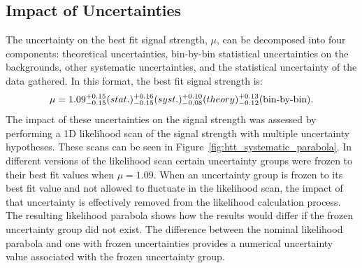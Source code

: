 %
%


\subsection{Impact of Uncertainties}
The uncertainty on the best fit signal strength, $\mu$, can be decomposed into four components: theoretical uncertainties, 
bin-by-bin statistical uncertainties on the backgrounds, other systematic uncertainties, and the statistical 
uncertainty of the data gathered. In this format, the best fit signal strength is:
\[ \mu = 1.09^{+0.15}_{-0.15}(stat.){}^{+0.16}_{-0.15}(syst.){}^{+0.10}_{-0.08}(theory){}^{+0.13}_{-0.12} \text{(bin-by-bin).}\]
The impact of these uncertainties on the signal strength was assessed by performing a 1D likelihood scan of 
the signal strength with multiple uncertainty hypotheses. These scans can be seen in 
Figure~\ref{fig:htt_systematic_parabola}. In different versions of the likelihood scan
certain uncertainty groups were frozen to their best fit values when $\mu = 1.09$. When an uncertainty group is frozen to
its best fit value and not allowed to fluctuate in the likelihood scan, the impact of that uncertainty is
effectively removed from the likelihood calculation process. The resulting likelihood parabola shows how
the results would differ if the frozen uncertainty group did not exist. The difference between the nominal
likelihood parabola and one with frozen uncertainties provides a numerical uncertainty value associated with
the frozen uncertainty group.


